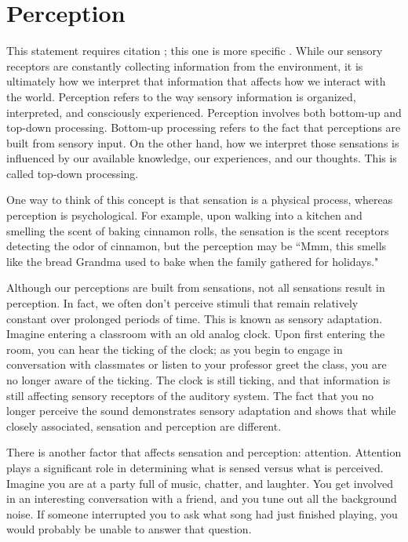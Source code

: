 \section{Perception}
This statement requires citation \cite{article_key}; this one is more specific \cite[162]{book_key}.
While our sensory receptors are constantly collecting information from the environment, it is ultimately how we interpret that information that affects how we interact with the world. Perception refers to the way sensory information is organized, interpreted, and consciously experienced. Perception involves both bottom-up and top-down processing. Bottom-up processing refers to the fact that perceptions are built from sensory input. On the other hand, how we interpret those sensations is influenced by our available knowledge, our experiences, and our thoughts. This is called top-down processing.

One way to think of this concept is that sensation is a physical process, whereas perception is psychological. For example, upon walking into a kitchen and smelling the scent of baking cinnamon rolls, the sensation is the scent receptors detecting the odor of cinnamon, but the perception may be ``Mmm, this smells like the bread Grandma used to bake when the family gathered for holidays."

Although our perceptions are built from sensations, not all sensations result in perception. In fact, we often don’t perceive stimuli that remain relatively constant over prolonged periods of time. This is known as sensory adaptation. Imagine entering a classroom with an old analog clock. Upon first entering the room, you can hear the ticking of the clock; as you begin to engage in conversation with classmates or listen to your professor greet the class, you are no longer aware of the ticking. The clock is still ticking, and that information is still affecting sensory receptors of the auditory system. The fact that you no longer perceive the sound demonstrates sensory adaptation and shows that while closely associated, sensation and perception are different.

There is another factor that affects sensation and perception: attention. Attention plays a significant role in determining what is sensed versus what is perceived. Imagine you are at a party full of music, chatter, and laughter. You get involved in an interesting conversation with a friend, and you tune out all the background noise. If someone interrupted you to ask what song had just finished playing, you would probably be unable to answer that question.

